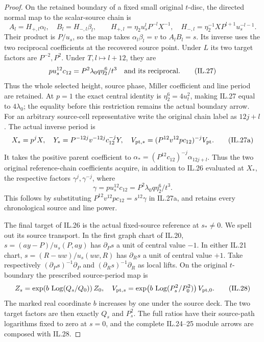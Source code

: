 \begin{proof}
On the retained boundary of a fixed small original \(t\)-disc,
the directed normal map to the scalar-source chain is
\[
 A_l=H_{+,l}\alpha_l,\quad B_l=H_{-,l}\beta_l,\qquad
 H_{+,l}=\eta_2u_s^lP^{-l}X^{-1},\quad
 H_{-,l}=\eta_2^{-1}XP^{l+1}u_s^{-l-1}.
 \tag{IL.26}
\]
Their product is \(P/u_s\), so the map takes
\(\alpha_l\beta_l=v\) to \(A_lB_l=s\). Its inverse uses the
two reciprocal coefficients at the recovered source point.
Under \(L\) its two target factors are \(P^{-2},P^2\).
Under \(T,l\mapsto l+12\), they are
\[
 p u_s^{12}c_{12}
       =P^2\lambda_0q\eta_2^6/t^3
 \quad\hbox{and its reciprocal}.
 \tag{IL.27}
\]
Thus the whole selected height, source phase, Miller coefficient
and line period are retained. At \(p=1\) the exact central
identity is \(\eta_2^6=4u_t^2\), making IL.27 equal to
\(4\lambda_0\); the equality before this restriction remains
the actual boundary arrow. For an arbitrary source-cell representative
write the original chain label as \(12j+l\). The actual inverse period is
\[
 X_*=p^jX,\quad
 Y_*=P^{-12j}v^{-12j}c_{12}^{-j}Y,\quad
 V_{{\rm pt},*}=(P^{12}v^{12}pc_{12})^{-j}V_{\rm pt}.
 \tag{IL.27a}
\]
It takes the positive parent coefficient to
\(\alpha_*=(P^{12}c_{12})^{-j}\alpha_{12j+l}\).
Thus the two original reference-chain coefficients acquire,
in addition to IL.26 evaluated at \(X_*\), the respective
factors \(\gamma^j,\gamma^{-j}\), where
\[
                   \gamma=pu_s^{12}c_{12}
                         =P^2\lambda_0q\eta_2^6/t^3.
 \tag{IL.27b}
\]
This follows by substituting
\(P^{12}v^{12}pc_{12}=s^{12}\gamma\) in
IL.27a, and retains every chronological source and line power.

The final target of IL.26 is the actual fixed-source reference
at \(s_*\ne0\). We spell out its source transport. In the
first graph chart of IL.20,
\(s=(ay-P)/u_s(P,ay)\) has \(\partial_Ps\) a unit of
central value \(-1\). In either IL.21 chart,
\(s=(R-uw)/u_s(uw,R)\) has \(\partial_Rs\) a unit of
central value \(+1\). Take respectively
\((\partial_Ps)^{-1}\partial_P\) and
\((\partial_Rs)^{-1}\partial_R\) as local lifts.
On the original \(t\)-boundary the prescribed source-period map is
\[
 Z_s=\exp\!\left(b\,\operatorname{Log}(Q_s/Q_0)\right)Z_0,
 \quad
 V_{{\rm pt},s}=\exp\!\left(
 b\,\operatorname{Log}(P_s^2/P_0^2)\right)V_{{\rm pt},0}.
 \tag{IL.28}
\]
The marked real coordinate \(b\) increases by one under the
source deck. The two target factors are then exactly \(Q_s\)
and \(P_s^2\). The full ratios have their source-path logarithms
fixed to zero at \(s=0\), and the complete IL.24--25 module
arrows are composed with IL.28.


\end{proof}
